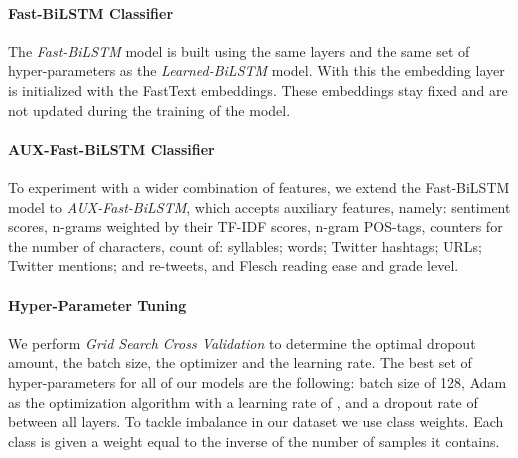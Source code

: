 \documentclass{article}
\begin{document}
\paragraph{Fast-BiLSTM Classifier}\label{fastBiLSTMClassifier}
The \textit{Fast-BiLSTM} model is built using the same layers and the same set of hyper-parameters as the \textit{Learned-BiLSTM} model. With this the embedding layer is initialized with the FastText embeddings. These embeddings stay fixed and are not updated during the training of the model. 

\paragraph{AUX-Fast-BiLSTM Classifier}\label{auxFastBilstmClassifier} To experiment with a wider combination of features, we extend the Fast-BiLSTM model to \textit{AUX-Fast-BiLSTM}, which accepts auxiliary features, namely: sentiment scores, n-grams weighted by their TF-IDF scores, n-gram POS-tags, counters for the number of characters, count of: syllables; words; Twitter hashtags; URLs; Twitter mentions; and re-tweets, and Flesch reading ease and grade level.


\paragraph{Hyper-Parameter Tuning}
We perform \textit{Grid Search Cross Validation}  to determine the optimal dropout amount, the batch size, the optimizer and the learning rate. The best set of hyper-parameters for all of our models are the following: batch size of 128, Adam \cite{kingma2014adam} as the optimization algorithm with a learning rate of , and a dropout rate of  between all layers. To tackle  imbalance in our dataset we use class weights. Each class is given a weight equal to the inverse of the number of samples it contains.
\end{document}
